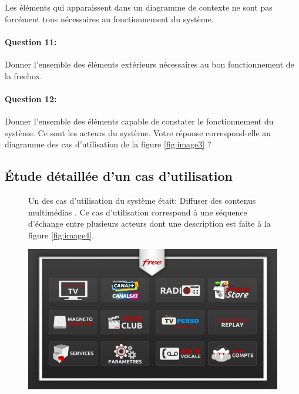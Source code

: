 Les éléments qui apparaissent dans un diagramme de contexte ne sont pas forcément tous nécessaires au fonctionnement du système.

\paragraph{Question 11:} Donner l'ensemble des éléments extérieurs nécessaires au bon fonctionnement de la freebox.

\paragraph{Question 12:} Donner l'ensemble des éléments capable de \og constater \fg le fonctionnement du système. Ce sont les acteurs du système. Votre réponse correspond-elle au diagramme des cas d'utilisation de la figure \ref{fig:image3} ?

\subsection{Étude détaillée d'un cas d'utilisation}

\begin{figure}[!h]
\begin{minipage}{0.58\linewidth}
Un des cas d'utilisation du système était: \og Diffuser des contenus multimédias \fg. Ce cas d'utilisation correspond à une séquence d'échange entre plusieurs acteurs dont une description est faite à la figure \ref{fig:image4}.
\end{minipage}
\hfill
\begin{minipage}{0.4\linewidth}
\includegraphics[width=0.8\linewidth]{img/menu}
\end{minipage}
\end{figure}

